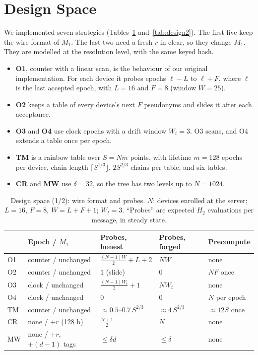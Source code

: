 \section{Design Space}\label{sec:design}
We implemented seven strategies (Tables~\ref{tab:design} and~\ref{tab:design2}). The first five keep the wire format of $M_1$. The last two need
a fresh $r$ in clear, so they change $M_1$. They are modelled at the resolution level, with the same keyed hash.
\begin{itemize}
\item \textbf{O1}, counter with a linear scan, is the behaviour of our original implementation. For each device it probes
epochs $\ell-L$ to $\ell+F$, where $\ell$ is the last accepted epoch, with $L=16$ and $F=8$ (window $W=25$).
\item \textbf{O2} keeps a table of every device's next $F$ pseudonyms and slides it after each acceptance.
\item \textbf{O3} and \textbf{O4} use clock epochs with a drift window $W_t=3$. O3 scans, and O4 extends a table once per
epoch.
\item \textbf{TM} is a rainbow table over $S=Nm$ points, with lifetime $m=128$ epochs per device, chain length
$\lceil S^{1/3}\rfloor$, $2S^{2/3}$ chains per table, and six tables.
\item \textbf{CR} and \textbf{MW} use $\delta=32$, so the tree has two levels up to $N=1024$.
\end{itemize}

\begin{table}[t]
\centering
\caption{Design space (1/2): wire format and probes. $N$: devices enrolled at the server; $L=16$, $F=8$, $W=L+F+1$;
$W_t=3$. ``Probes'' are expected $H_2$ evaluations per message, in steady state.}
\label{tab:design}
\scriptsize
\setlength{\tabcolsep}{3pt}
\begin{tabular}{@{}l l l l l@{}}
\toprule
 & Epoch / $M_1$ & Probes, honest & Probes, forged & Precompute \\
\midrule
O1 & counter / unchanged & $\frac{(N-1)W}{2}+L+2$ & $NW$ & none \\
O2 & counter / unchanged & $1$ (slide) & $0$ & $NF$ once \\
O3 & clock / unchanged & $\frac{(N-1)W_t}{2}+1$ & $NW_t$ & none \\
O4 & clock / unchanged & $0$ & $0$ & $N$ per epoch \\
TM & counter / unchanged & $\approx0.5$--$0.7\,S^{2/3}$ & $\approx4\,S^{2/3}$ & $\approx12S$ once \\
CR & none / $+r$ (128 b) & $\frac{N+1}{2}$ & $N$ & none \\
MW & none / $+r$, $+(d-1)$ tags & $\le\delta d$ & $\le\delta$ & none \\
\bottomrule
\end{tabular}
\end{table}

